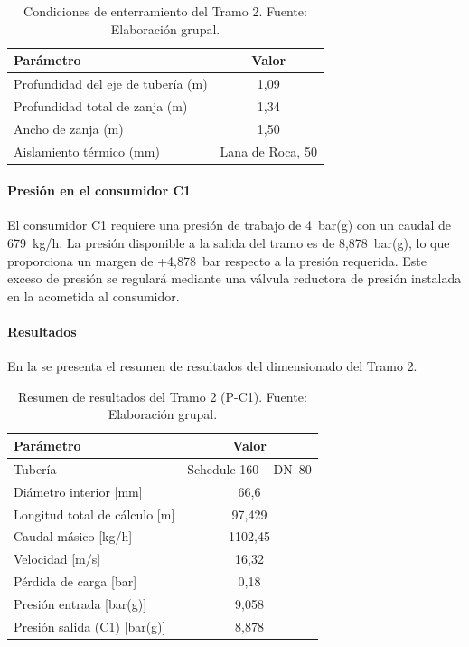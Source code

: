 \documentclass[12pt]{article}
\begin{document}
\begin{table}[H]
	\centering
	\caption{Condiciones de enterramiento del Tramo 2. Fuente: Elaboración grupal.}
	\label{tab:enterramiento-tramo2}
	\begin{tabular}{lc}
		\toprule
		\textbf{Parámetro}                 & \textbf{Valor}   \\
		\midrule
		Profundidad del eje de tubería (m) & 1{,}09           \\
		Profundidad total de zanja (m)     & 1{,}34           \\
		Ancho de zanja (m)                 & 1{,}50           \\
		Aislamiento térmico (mm)           & Lana de Roca, 50 \\
		\bottomrule
	\end{tabular}
\end{table}

\paragraph{Presión en el consumidor C1}

El consumidor C1 requiere una presión de trabajo de 4~bar(g) con un caudal de 679~kg/h. La presión disponible a la salida del tramo es de 8{,}878~bar(g), lo que proporciona un margen de +4{,}878~bar respecto a la presión requerida. Este exceso de presión se regulará mediante una válvula reductora de presión instalada en la acometida al consumidor.

\paragraph{Resultados}

En la  se presenta el resumen de resultados del dimensionado del Tramo 2.

\begin{table}[H]
	\centering
	\caption{Resumen de resultados del Tramo 2 (P-C1). Fuente: Elaboración grupal.}
	\label{tab:resumen-tramo2}
	\begin{tabular}{lc}
		\toprule
		\textbf{Parámetro}        & \textbf{Valor}        \\
		\midrule
		Tubería                   & Schedule 160 -- DN~80 \\
		Diámetro interior [mm]         & 66{,}6            \\
		Longitud total de cálculo [m] & 97{,}429           \\
		Caudal másico [kg/h]             & 1102{,}45       \\
		Velocidad [m/s]                 & 16{,}32          \\
		Pérdida de carga [bar]          & 0{,}18           \\
		Presión entrada [bar(g)]           & 9{,}058       \\
		Presión salida (C1) [bar(g)]       & 8{,}878      \\
		\bottomrule
	\end{tabular}
\end{table}
\end{document}
